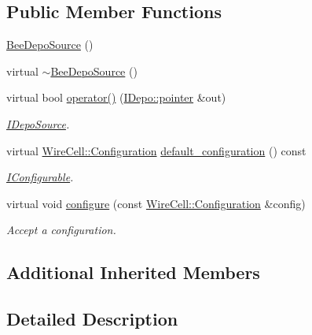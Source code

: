 \subsection*{Public Member Functions}
\begin{DoxyCompactItemize}
\item 
\hyperlink{class_wire_cell_1_1_sio_1_1_bee_depo_source_a6b0c3ff8d4b1221de65d5ea0e80f96c1}{Bee\+Depo\+Source} ()
\item 
virtual \hyperlink{class_wire_cell_1_1_sio_1_1_bee_depo_source_ac15f444494dc959097ce18a4f284caee}{$\sim$\+Bee\+Depo\+Source} ()
\item 
virtual bool \hyperlink{class_wire_cell_1_1_sio_1_1_bee_depo_source_abc1bffd5023b173c45fc61bcffd4aed4}{operator()} (\hyperlink{class_wire_cell_1_1_i_data_aff870b3ae8333cf9265941eef62498bc}{I\+Depo\+::pointer} \&out)
\begin{DoxyCompactList}\small\item\em \hyperlink{class_wire_cell_1_1_i_depo_source}{I\+Depo\+Source}. \end{DoxyCompactList}\item 
virtual \hyperlink{namespace_wire_cell_a9f705541fc1d46c608b3d32c182333ee}{Wire\+Cell\+::\+Configuration} \hyperlink{class_wire_cell_1_1_sio_1_1_bee_depo_source_af5303df21129d427f592bf101d4fcefb}{default\+\_\+configuration} () const
\begin{DoxyCompactList}\small\item\em \hyperlink{class_wire_cell_1_1_i_configurable}{I\+Configurable}. \end{DoxyCompactList}\item 
virtual void \hyperlink{class_wire_cell_1_1_sio_1_1_bee_depo_source_a3c1f29938d5d3c0a5622f78ee777bb02}{configure} (const \hyperlink{namespace_wire_cell_a9f705541fc1d46c608b3d32c182333ee}{Wire\+Cell\+::\+Configuration} \&config)
\begin{DoxyCompactList}\small\item\em Accept a configuration. \end{DoxyCompactList}\end{DoxyCompactItemize}
\subsection*{Additional Inherited Members}


\subsection{Detailed Description}


